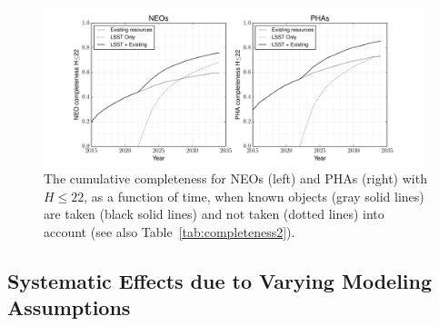 \begin{figure}[t!]
\centering
\includegraphics[width=0.99\textwidth]{figures/astro_lsst_01_1016_completeness.pdf}
\vskip -0.2in
\caption{The cumulative completeness for NEOs (left) and PHAs (right) with $H\le22$, as a function of
time, when known objects (gray solid lines) are taken (black solid lines) and not taken (dotted lines)
into  account (see also Table~\ref{tab:completeness2}).
\label{fig:knownObj}}
\end{figure}



\subsection{Systematic Effects due to Varying Modeling Assumptions \label{sec:syseff}}

